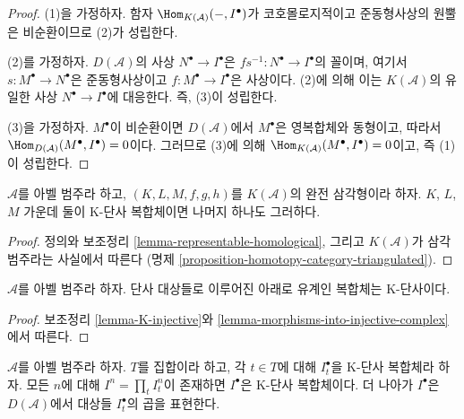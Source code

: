 \begin{proof}
(1)을 가정하자. 함자
$\Hom_{K(\mathcal{A})}( - , I^\bullet)$가 코호몰로지적이고
준동형사상의 원뿔은 비순환이므로 (2)가 성립한다.

\medskip\noindent
(2)를 가정하자. $D(\mathcal{A})$의 사상
$N^\bullet \to I^\bullet$은 $fs^{-1} : N^\bullet \to I^\bullet$의
꼴이며, 여기서 $s : M^\bullet \to N^\bullet$은 준동형사상이고
$f : M^\bullet \to I^\bullet$은 사상이다. (2)에 의해 이는
$K(\mathcal{A})$의 유일한 사상 $N^\bullet \to I^\bullet$에
대응한다. 즉, (3)이 성립한다.

\medskip\noindent
(3)을 가정하자. $M^\bullet$이 비순환이면 $D(\mathcal{A})$에서
$M^\bullet$은 영복합체와 동형이고, 따라서
$\Hom_{D(\mathcal{A})}(M^\bullet, I^\bullet) = 0$이다.
그러므로 (3)에 의해
$\Hom_{K(\mathcal{A})}(M^\bullet, I^\bullet) = 0$이고,
즉 (1)이 성립한다.
\end{proof}

\begin{lemma}
\label{lemma-triangle-K-injective}
$\mathcal{A}$를 아벨 범주라 하고, $(K, L, M, f, g, h)$를
$K(\mathcal{A})$의 완전 삼각형이라 하자. $K$, $L$, $M$ 가운데
둘이 K-단사 복합체이면 나머지 하나도 그러하다.
\end{lemma}

\begin{proof}
정의와 보조정리 \ref{lemma-representable-homological}, 그리고
$K(\mathcal{A})$가 삼각 범주라는 사실에서 따른다
(명제 \ref{proposition-homotopy-category-triangulated}).
\end{proof}

\begin{lemma}
\label{lemma-bounded-below-injectives-K-injective}
$\mathcal{A}$를 아벨 범주라 하자. 단사 대상들로 이루어진 아래로
유계인 복합체는 K-단사이다.
\end{lemma}

\begin{proof}
보조정리 \ref{lemma-K-injective}와
\ref{lemma-morphisms-into-injective-complex}에서 따른다.
\end{proof}

\begin{lemma}
\label{lemma-product-K-injective}
$\mathcal{A}$를 아벨 범주라 하자. $T$를 집합이라 하고, 각
$t \in T$에 대해 $I_t^\bullet$을 K-단사 복합체라 하자.
모든 $n$에 대해 $I^n = \prod_t I_t^n$이 존재하면 $I^\bullet$은
K-단사 복합체이다. 더 나아가 $I^\bullet$은 $D(\mathcal{A})$에서
대상들 $I_t^\bullet$의 곱을 표현한다.
\end{lemma}

